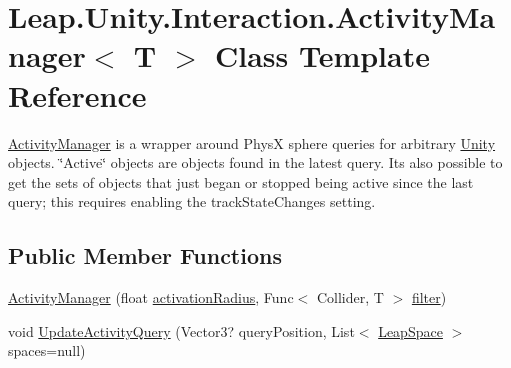 \hypertarget{class_leap_1_1_unity_1_1_interaction_1_1_activity_manager}{}\section{Leap.\+Unity.\+Interaction.\+Activity\+Manager$<$ T $>$ Class Template Reference}
\label{class_leap_1_1_unity_1_1_interaction_1_1_activity_manager}


\mbox{\hyperlink{class_leap_1_1_unity_1_1_interaction_1_1_activity_manager}{Activity\+Manager}} is a wrapper around PhysX sphere queries for arbitrary \mbox{\hyperlink{namespace_leap_1_1_unity}{Unity}} objects. \char`\"{}\+Active\char`\"{} objects are objects found in the latest query. It\textquotesingle{}s also possible to get the sets of objects that just began or stopped being active since the last query; this requires enabling the track\+State\+Changes setting.  


\subsection*{Public Member Functions}
\begin{DoxyCompactItemize}
\item 
\mbox{\hyperlink{class_leap_1_1_unity_1_1_interaction_1_1_activity_manager_a0cb68553a311b475892432f29e81804a}{Activity\+Manager}} (float \mbox{\hyperlink{class_leap_1_1_unity_1_1_interaction_1_1_activity_manager_ae47334dd4fde13e8908798fe74cb4e52}{activation\+Radius}}, Func$<$ Collider, T $>$ \mbox{\hyperlink{class_leap_1_1_unity_1_1_interaction_1_1_activity_manager_ac8bb61c2fa074a351cfc4e7a44a0656b}{filter}})
\item 
void \mbox{\hyperlink{class_leap_1_1_unity_1_1_interaction_1_1_activity_manager_a26118f4813558f0c2258acea8e47a0a0}{Update\+Activity\+Query}} (Vector3? query\+Position, List$<$ \mbox{\hyperlink{class_leap_1_1_unity_1_1_space_1_1_leap_space}{Leap\+Space}} $>$ spaces=null)
\end{DoxyCompactItemize}
